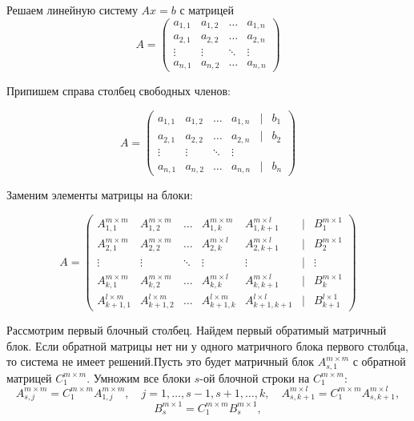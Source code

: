 \documentclass[a4paper,12pt]{article}
\begin{document}
Решаем линейную систему $Ax=b$ с матрицей
$$A=
   \begin{pmatrix}
     a_{1,1}& a_{1,2} &\ldots & a_{1,n}\\
     a_{2,1}& a_{2,2} &\ldots & a_{2,n}\\
     \vdots& \vdots &\ddots & \vdots\\
     a_{n,1}& a_{n,2} &\ldots & a_{n,n}
    \end{pmatrix}
$$

Припишем справа столбец свободных членов:

$$A=
   \begin{pmatrix}
     a_{1,1}& a_{1,2} &\ldots & a_{1,n} & \mid & b_1\\
     a_{2,1}& a_{2,2} &\ldots & a_{2,n} & \mid & b_2\\
     \vdots& \vdots &\ddots & \vdots\\
     a_{n,1}& a_{n,2} &\ldots & a_{n,n} & \mid & b_n
    \end{pmatrix}
$$

Заменим элементы матрицы на блоки:

$$
A=
   \begin{pmatrix}
     A^{m \times m}_{1,1}& A^{m \times m}_{1,2} &\ldots & A^{m \times m}_{1,k} & A^{m \times l}_{1,k+1} & \mid & B^{m \times 1}_1\\
     A^{m \times m}_{2,1}& A^{m \times m}_{2,2} &\ldots & A^{m \times l}_{2,k} & A^{m \times l}_{2,k+1} & \mid & B^{m \times 1}_2\\
     \vdots& \vdots &\ddots & \vdots & \vdots & \mid  & \vdots\\
     A^{m \times m}_{k,1}& A^{m \times m}_{k,2} &\ldots & A^{m \times l}_{k,k} & A^{m \times l}_{k,k+1} & \mid & B^{m \times 1}_k\\
     A^{l \times m}_{k+1,1} & A^{l \times m}_{k+1,2} & \ldots & A^{l \times m}_{k+1,k} & A^{l \times l}_{k+1,k+1} & \mid & B^{l \times 1}_{k+1}
    \end{pmatrix}
$$

Рассмотрим первый блочный столбец. Найдем первый обратимый матричный блок. Если обратной матрицы нет ни у одного матричного блока первого столбца, то система не имеет решений.Пусть это будет матричный блок $A^{m \times m}_{s,1}$ с обратной матрицей $C^{m \times m}_1$. Умножим все блоки $s$-ой блочной строки на $C^{m \times m}_1$:
$$
    A^{m \times m}_{s,j} = C^{m \times m}_1A^{m \times m}_{1,j}, \quad j=1,\dots,s-1,s+1,\dots,k, \quad A^{m \times l}_{s, k+1} = C^{m \times m}_1A^{m \times l}_{s,k+1},
$$
$$
    B^{m \times 1}_s = C^{m \times m}_1B^{m \times 1}_s,
$$
\end{document}
